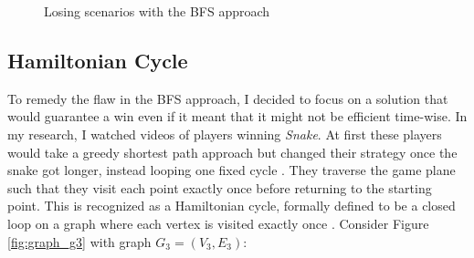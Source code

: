 \documentclass[12pt]{article}
\begin{document}
\begin{figure}[!h]
\centering
	\hspace{1.15em}
	\caption{Losing scenarios with the BFS approach}
	\label{fig:bfs_issues}
\end{figure}

\subsection{Hamiltonian Cycle}

To remedy the flaw in the BFS approach, I decided to focus on a solution that would guarantee a win even if it meant that it might not be efficient time-wise. In my research, I watched videos of players winning \textit{Snake}. At first these players would take a greedy shortest path approach but changed their strategy once the snake got longer, instead looping one fixed cycle \cite{easyspeezy2020}. They traverse the game plane such that they visit each point exactly once before returning to the starting point. This is recognized as a Hamiltonian cycle, formally defined to be a closed loop on a graph where each vertex is visited exactly once \cite{rahman2005}. Consider Figure \ref{fig:graph_g3} with graph $G_{3} = (V_{3}, E_{3})$:
\end{document}
